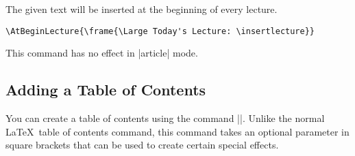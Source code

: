
\begin{command}{\AtBeginLecture{}}
  The given text will be inserted at the beginning of every
  lecture.

  \example
\begin{verbatim}
\AtBeginLecture{\frame{\Large Today's Lecture: \insertlecture}}
\end{verbatim}

  \articlenote
  This command has no effect in |article| mode.
\end{command}


\subsection{Adding a Table of Contents}

You can create a table of contents using the command
|\tableofcontents|. Unlike the normal \LaTeX\ table of contents
command, this command takes an optional parameter in square brackets
that can be used to create certain special effects.

